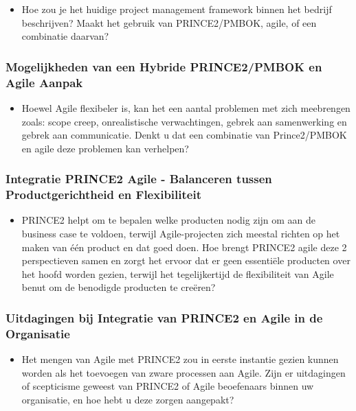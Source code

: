 \documentclass[dutch]{hogent-article}
\begin{document}
\begin{itemize}
    \item Hoe zou je het huidige project management framework binnen het bedrijf beschrijven? Maakt het gebruik van PRINCE2/PMBOK, agile, of een combinatie daarvan?
\end{itemize}

\subsubsection{Mogelijkheden van een Hybride PRINCE2/PMBOK en Agile Aanpak}
\label{ssec:Mogelijkheden en uitdagingen van een Hybride PRINCE2/PMBOK en Agile Aanpak}

\begin{itemize}
    \item Hoewel Agile flexibeler is, kan het een aantal  problemen met zich meebrengen zoals: scope creep, onrealistische verwachtingen, gebrek aan samenwerking en gebrek aan communicatie. Denkt u dat een combinatie van Prince2/PMBOK en agile deze problemen kan verhelpen?
\end{itemize}

\subsubsection{Integratie PRINCE2 Agile - Balanceren tussen Productgerichtheid en Flexibiliteit}
\label{ssec:Integratie PRINCE2 Agile - Balanceren tussen Productgerichtheid en Flexibiliteit}

\begin{itemize}
    \item PRINCE2 helpt om te bepalen welke producten nodig zijn om aan de business case te voldoen, terwijl Agile-projecten zich meestal richten op het maken van één product en dat goed doen. Hoe brengt PRINCE2 agile deze 2 perspectieven samen en zorgt het ervoor dat er geen essentiële producten over het hoofd worden gezien, terwijl het tegelijkertijd de flexibiliteit van Agile benut om de benodigde producten te creëren?
\end{itemize}

\subsubsection{Uitdagingen bij Integratie van PRINCE2 en Agile in de Organisatie}
\label{ssec:Uitdagingen en Overwinningen bij Integratie van PRINCE2 en Agile in de Organisatie}

\begin{itemize}
    \item Het mengen van Agile met PRINCE2 zou in eerste instantie gezien kunnen worden als het toevoegen van zware processen aan Agile. Zijn er uitdagingen of scepticisme geweest van PRINCE2 of Agile beoefenaars binnen uw organisatie, en hoe hebt u deze zorgen aangepakt?
\end{itemize}
\end{document}
